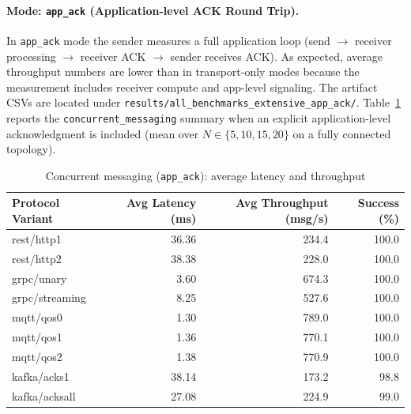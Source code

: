 \paragraph{Mode: \texttt{app\_ack} (Application-level ACK Round Trip).}
In \texttt{app\_ack} mode the sender measures a full application loop (send \(\rightarrow\) receiver processing \(\rightarrow\) receiver ACK \(\rightarrow\) sender receives ACK). As expected, average throughput numbers are lower than in transport-only modes because the measurement includes receiver compute and app-level signaling. The artifact CSVs are located under \texttt{results/all\_benchmarks\_extensive\_app\_ack/}.
Table~\ref{tab:concurrent-app-ack} reports the \texttt{concurrent\_messaging} summary when an explicit application-level acknowledgment is included (mean over $N \in \{5,10,15,20\}$ on a fully connected topology).

\begin{table}[H]
\centering

\label{tab:concurrent-app-ack}
\begin{tabular}{l|r|r|r}
\toprule
\textbf{Protocol Variant} & \textbf{Avg Latency (ms)} & \textbf{Avg Throughput (msg/s)} & \textbf{Success (\%)} \\
\midrule
rest/http1        & 36.36  & 234.4 & 100.0 \\
rest/http2        & 38.38  & 228.0 & 100.0 \\
grpc/unary        &  3.60  & 674.3 & 100.0 \\
grpc/streaming    &  8.25  & 527.6 & 100.0 \\
mqtt/qos0         &  1.30  & 789.0 & 100.0 \\
mqtt/qos1         &  1.36  & 770.1 & 100.0 \\
mqtt/qos2         &  1.38  & 770.9 & 100.0 \\
kafka/acks1       & 38.14  & 173.2 &  98.8 \\
kafka/acksall     & 27.08  & 224.9 &  99.0 \\
\bottomrule
\end{tabular}
\caption{Concurrent messaging (\texttt{app\_ack}): average latency and throughput}
\end{table}

